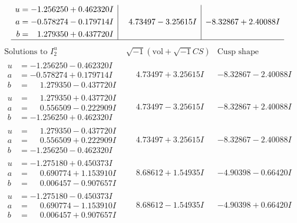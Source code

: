 \documentclass[1p]{elsarticle_modified}
\theoremstyle{definition}
\newcommand{\I}{\sqrt{-1}}
\begin{document}
$$\begin{array}{c|c|c}
\begin{aligned}
u &= -1.256250 + 0.462320 I \\
a &= -0.578274 - 0.179714 I \\
b &= \phantom{-}1.279350 + 0.437720 I\end{aligned}
 & \phantom{-}4.73497 - 3.25615 I & -8.32867 + 2.40088 I\\
 \hline 
 \end{array}$$\newpage$$\begin{array}{c|c|c}  
\text{Solutions to }I^u_{2}& \I (\text{vol} + \sqrt{-1}CS) & \text{Cusp shape}\\
 \hline 
\begin{aligned}
u &= -1.256250 - 0.462320 I \\
a &= -0.578274 + 0.179714 I \\
b &= \phantom{-}1.279350 - 0.437720 I\end{aligned}
 & \phantom{-}4.73497 + 3.25615 I & -8.32867 - 2.40088 I \\ \hline\begin{aligned}
u &= \phantom{-}1.279350 + 0.437720 I \\
a &= \phantom{-}0.556509 - 0.222909 I \\
b &= -1.256250 + 0.462320 I\end{aligned}
 & \phantom{-}4.73497 - 3.25615 I & -8.32867 + 2.40088 I \\ \hline\begin{aligned}
u &= \phantom{-}1.279350 - 0.437720 I \\
a &= \phantom{-}0.556509 + 0.222909 I \\
b &= -1.256250 - 0.462320 I\end{aligned}
 & \phantom{-}4.73497 + 3.25615 I & -8.32867 - 2.40088 I \\ \hline\begin{aligned}
u &= -1.275180 + 0.450373 I \\
a &= \phantom{-}0.690774 + 1.153910 I \\
b &= \phantom{-}0.006457 - 0.907657 I\end{aligned}
 & \phantom{-}8.68612 + 1.54935 I & -4.90398 - 0.66420 I \\ \hline\begin{aligned}
u &= -1.275180 - 0.450373 I \\
a &= \phantom{-}0.690774 - 1.153910 I \\
b &= \phantom{-}0.006457 + 0.907657 I\end{aligned}
 & \phantom{-}8.68612 - 1.54935 I & -4.90398 + 0.66420 I \\ \hline\begin{aligned}

\end{aligned}
\end{array}$$
\end{document}

